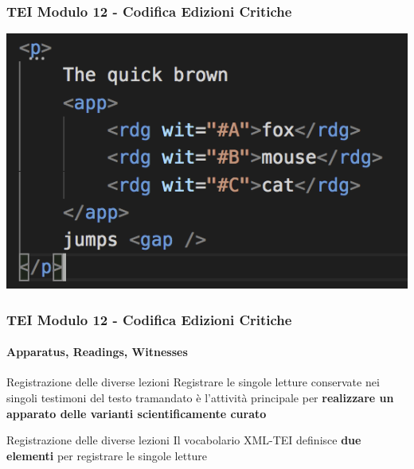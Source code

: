 \begin{frame}
    \frametitle{TEI Modulo 12 - Codifica Edizioni Critiche}
    \addtocounter{nframe}{1}
    


    \begin{center}
        \includegraphics[width=.95\textwidth]{imgs/fox-jumps.png}
    \end{center}

\end{frame}





\begin{frame}
    \frametitle{TEI Modulo 12 - Codifica Edizioni Critiche}
    \framesubtitle{Apparatus, Readings, Witnesses}
    \addtocounter{nframe}{1}




    \begin{block}{Registrazione delle diverse lezioni}
        Registrare le singole letture conservate nei singoli testimoni del testo tramandato è l'attività principale per \textbf{realizzare un apparato delle varianti scientificamente curato} 
    \end{block}

    \begin{block}{Registrazione delle diverse lezioni}
        Il vocabolario XML-TEI definisce \textbf{due elementi} per registrare le singole letture 
    \end{block}


\end{frame}



